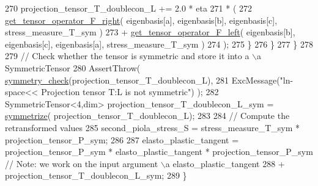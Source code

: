 \begin{DoxyCode}
270                             projection\_tensor\_T\_doublecon\_L += 2.0 * eta
271                                                                * (
272                                                                       
      \hyperlink{functions_8h_acfd8da38df3766246f7bcf0e736ad9f4}{get\_tensor\_operator\_F\_right}( eigenbasis[a], eigenbasis[b], eigenbasis[c], 
      stress\_measure\_T\_sym )
273                                                                     + 
      \hyperlink{functions_8h_a6f9435c7728281851248d3537c100e7d}{get\_tensor\_operator\_F\_left}(  eigenbasis[b], eigenbasis[c], eigenbasis[a], 
      stress\_measure\_T\_sym )
274                                                                   );
275                         \}
276                 \}
277          \}
278     
279         \textcolor{comment}{// Check whether the tensor is symmetric and store it into a \(\backslash\)a SymmetricTensor}
280          AssertThrow( \hyperlink{functions_8h_aa37f13547b984cb066e2fcb530b36425}{symmetry\_check}(projection\_tensor\_T\_doublecon\_L),
281                       ExcMessage(\textcolor{stringliteral}{"ln-space<< Projection tensor T:L is not symmetric"}) );
282          SymmetricTensor<4,dim> projection\_tensor\_T\_doublecon\_L\_sym = \hyperlink{functions_8h_afe83e9509497294b7f662b800b6b91ff}{symmetrize}(
      projection\_tensor\_T\_doublecon\_L);
283     
284         \textcolor{comment}{// Compute the retransformed values}
285          second\_piola\_stress\_S = stress\_measure\_T\_sym * projection\_tensor\_P\_sym;
286     
287          elasto\_plastic\_tangent = projection\_tensor\_P\_sym * elasto\_plastic\_tangent * 
      projection\_tensor\_P\_sym \textcolor{comment}{// Note: we work on the input argument \(\backslash\)a elasto\_plastic\_tangent}
288                                   + projection\_tensor\_T\_doublecon\_L\_sym;
289     \}
\end{DoxyCode}
